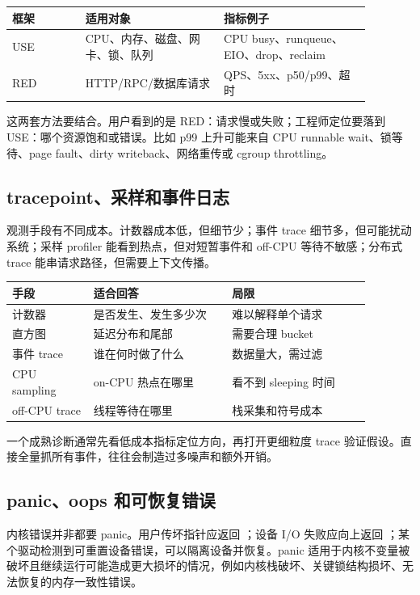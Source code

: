 \begin{longtable}{|p{0.18\linewidth}|p{0.34\linewidth}|p{0.36\linewidth}|}
\toprule
框架 & 适用对象 & 指标例子 \\
\midrule
USE & CPU、内存、磁盘、网卡、锁、队列 & CPU busy、runqueue、EIO、drop、reclaim \\\tablerowrule
RED & HTTP/RPC/数据库请求 & QPS、5xx、p50/p99、超时 \\
\bottomrule
\end{longtable}

这两套方法要结合。用户看到的是 RED：请求慢或失败；工程师定位要落到 USE：哪个资源饱和或错误。比如 p99 上升可能来自 CPU runnable wait、锁等待、page fault、dirty writeback、网络重传或 cgroup throttling。

\subsection{tracepoint、采样和事件日志}

观测手段有不同成本。计数器成本低，但细节少；事件 trace 细节多，但可能扰动系统；采样 profiler 能看到热点，但对短暂事件和 off-CPU 等待不敏感；分布式 trace 能串请求路径，但需要上下文传播。

\begin{longtable}{|p{0.2\linewidth}|p{0.34\linewidth}|p{0.34\linewidth}|}
\toprule
手段 & 适合回答 & 局限 \\
\midrule
计数器 & 是否发生、发生多少次 & 难以解释单个请求 \\\tablerowrule
直方图 & 延迟分布和尾部 & 需要合理 bucket \\\tablerowrule
事件 trace & 谁在何时做了什么 & 数据量大，需过滤 \\\tablerowrule
CPU sampling & on-CPU 热点在哪里 & 看不到 sleeping 时间 \\\tablerowrule
off-CPU trace & 线程等待在哪里 & 栈采集和符号成本 \\
\bottomrule
\end{longtable}

一个成熟诊断通常先看低成本指标定位方向，再打开更细粒度 trace 验证假设。直接全量抓所有事件，往往会制造过多噪声和额外开销。

\subsection{panic、oops 和可恢复错误}

内核错误并非都要 panic。用户传坏指针应返回 ；设备 I/O 失败应向上返回 ；某个驱动检测到可重置设备错误，可以隔离设备并恢复。panic 适用于内核不变量被破坏且继续运行可能造成更大损坏的情况，例如内核栈破坏、关键锁结构损坏、无法恢复的内存一致性错误。

